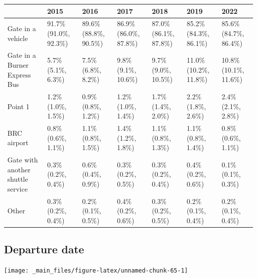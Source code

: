\documentclass[
]{book}
\begin{document}
\begin{table}
\centering
\begin{tabular}[t]{>{}l|>{}l|>{}l|>{}l|>{}l|>{}l|>{}l}
\hline
  & 2015 & 2016 & 2017 & 2018 & 2019 & 2022\\
\hline
Gate in a vehicle & 91.7\% (91.0\%, 92.3\%) & 89.6\% (88.8\%, 90.5\%) & 86.9\% (86.0\%, 87.8\%) & 87.0\% (86.1\%, 87.8\%) & 85.2\% (84.3\%, 86.1\%) & 85.6\% (84.7\%, 86.4\%)\\
\hline
Gate in a Burner Express Bus & 5.7\% (5.1\%, 6.3\%) & 7.5\% (6.8\%, 8.2\%) & 9.8\% (9.1\%, 10.6\%) & 9.7\% (9.0\%, 10.5\%) & 11.0\% (10.2\%, 11.8\%) & 10.8\% (10.1\%, 11.6\%)\\
\hline
Point 1 & 1.2\% (1.0\%, 1.5\%) & 0.9\% (0.8\%, 1.2\%) & 1.2\% (1.0\%, 1.4\%) & 1.7\% (1.4\%, 2.0\%) & 2.2\% (1.8\%, 2.6\%) & 2.4\% (2.1\%, 2.8\%)\\
\hline
BRC airport & 0.8\% (0.6\%, 1.1\%) & 1.1\% (0.8\%, 1.5\%) & 1.4\% (1.2\%, 1.8\%) & 1.1\% (0.8\%, 1.3\%) & 1.1\% (0.8\%, 1.4\%) & 0.8\% (0.6\%, 1.1\%)\\
\hline
Gate with another shuttle service & 0.3\% (0.2\%, 0.4\%) & 0.6\% (0.4\%, 0.9\%) & 0.3\% (0.2\%, 0.5\%) & 0.3\% (0.2\%, 0.4\%) & 0.4\% (0.2\%, 0.6\%) & 0.1\% (0.1\%, 0.3\%)\\
\hline
Other & 0.3\% (0.2\%, 0.4\%) & 0.2\% (0.1\%, 0.5\%) & 0.4\% (0.2\%, 0.6\%) & 0.3\% (0.2\%, 0.5\%) & 0.2\% (0.1\%, 0.4\%) & 0.2\% (0.1\%, 0.4\%)\\
\hline
\end{tabular}
\end{table}

\hypertarget{departure-date}{%
\subsection{Departure date}\label{departure-date}}

\texttt{[image: \_main\_files/figure-latex/unnamed-chunk-65-1]}
\end{document}
